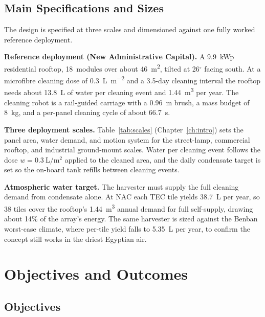 \documentclass[12pt,a4paper]{report}   %
\begin{document}
\section{Main Specifications and Sizes}

The design is specified at three scales and dimensioned against one fully worked
reference deployment.

\textbf{Reference deployment (New Administrative Capital).} A \SI{9.9}{\kilo\watt}p
residential rooftop, 18~modules over about \SI{46}{\metre\squared}, tilted at
26$^\circ$ facing south. At a microfibre cleaning dose of
\SI{0.3}{\liter\per\metre\squared} and a 3.5-day cleaning interval the rooftop needs
about \SI{13.8}{\liter} of water per cleaning event and \SI{1.44}{\cubic\metre} per
year. The cleaning robot is a rail-guided carriage with a \SI{0.96}{\metre} brush,
a mass budget of \SI{8}{\kilo\gram}, and a per-panel cleaning cycle of about
\SI{66.7}{\second}.

\textbf{Three deployment scales.} Table~\ref{tab:scales} (Chapter~\ref{ch:intro})
sets the panel area, water demand, and motion system for the street-lamp, commercial
rooftop, and industrial ground-mount scales. Water per cleaning event follows the dose
$w=\SI{0.3}{\liter\per\metre\squared}$ applied to the cleaned area, and the daily
condensate target is set so the on-board tank refills between cleaning events.

\textbf{Atmospheric water target.} The harvester must supply the full cleaning demand
from condensate alone. At NAC each TEC tile yields \SI{38.7}{\liter} per year, so 38
tiles cover the rooftop's \SI{1.44}{\cubic\metre} annual demand for full self-supply,
drawing about 14\% of the array's energy. The same harvester is sized against the
Benban worst-case climate, where per-tile yield falls to \SI{5.35}{\liter} per year,
to confirm the concept still works in the driest Egyptian air.

\chapter{Objectives and Outcomes}
\label{ch:objectives}

\section{Objectives}
\end{document}
